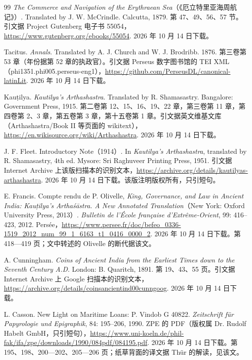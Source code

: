 \begin{thebibliography}{99}
 \emph{The Commerce and Navigation of the Erythraean Sea}（《厄立特里亚海周航记》）. Translated by J. W. McCrindle. Calcutta, 1879. 第 47、49、56、57 节。引文据 Project Gutenberg 电子书 55054，\url{https://www.gutenberg.org/ebooks/55054}. 2026 年 10 月 14 日下载。

 Tacitus. \emph{Annals}. Translated by A. J. Church and W. J. Brodribb. 1876. 第三卷第 53 章（年份据第 52 章的执政官）。引文据 Perseus 数字图书馆的 TEI XML（phi1351.phi005.perseus-eng1），\url{https://github.com/PerseusDL/canonical-latinLit}. 2026 年 10 月 14 日下载。

 Kauṭilya. \emph{Kautilya's Arthashastra}. Translated by R. Shamasastry. Bangalore: Government Press, 1915. 第二卷第 12、15、16、19、22 章，第三卷第 11 章，第四卷第 2、3 章，第五卷第 3 章，第十五卷第 1 章。引文据英文维基文库（Arthashastra/Book II 等页面的 wikitext），\url{https://en.wikisource.org/wiki/Arthashastra}. 2026 年 10 月 14 日下载。

 J. F. Fleet. Introductory Note（1914）. In \emph{Kautilya's Arthashastra}, translated by R. Shamasastry, 4th ed. Mysore: Sri Raghuveer Printing Press, 1951. 引文据 Internet Archive 上该版扫描本的识别文本，\url{https://archive.org/details/kautilyas-arthashastra}. 2026 年 10 月 14 日下载。该版注明版权所有，只引短句。

 E. Francis. Compte rendu de P. Olivelle, \emph{King, Governance, and Law in Ancient India: Kauṭilya's Arthaśāstra. A New Annotated Translation}（New York: Oxford University Press, 2013）. \emph{Bulletin de l'École française d'Extrême-Orient}, 99: 416--423, 2012. Persée，\url{https://www.persee.fr/doc/befeo_0336-1519_2012_num_99_1_6163_t1_0416_0000_2}. 2026 年 10 月 14 日下载。第 418—419 页；文中转述的 Olivelle 的断代据该文。

 A. Cunningham. \emph{Coins of Ancient India from the Earliest Times down to the Seventh Century A.D.} London: B. Quaritch, 1891. 第 19、43、55 页。引文据 Internet Archive 上 Google 扫描本的识别文本，\url{https://archive.org/details/coinsancientind00cunngoog}. 2026 年 10 月 14 日下载。

 L. Casson. New Light on Maritime Loans: P. Vindob G 40822. \emph{Zeitschrift für Papyrologie und Epigraphik}, 84: 195--206, 1990. ZPE 的 PDF（版权属 Dr. Rudolf Habelt GmbH，只引短句），\url{https://www.uni-koeln.de/phil-fak/ifa/zpe/downloads/1990/084pdf/084195.pdf}. 2026 年 10 月 14 日下载。第 195、198、200—202、205—206 页；纸草背面的译文据 Thür 的解读，见该文。


\end{thebibliography}
